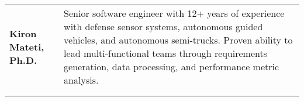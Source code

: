 \begin{tabular}{L{\lcolw} L{\rcolw}}
\textbf{\LARGE {Kiron Mateti, Ph.D.}} 
& {\large Senior software engineer with 12+ years of experience with defense sensor systems, 
autonomous guided vehicles, and autonomous semi-trucks. 
Proven ability to lead multi-functional teams through requirements generation, data processing, 
and performance metric analysis.
}
\\ 
\\
\hline \hline \\ 
\end{tabular}